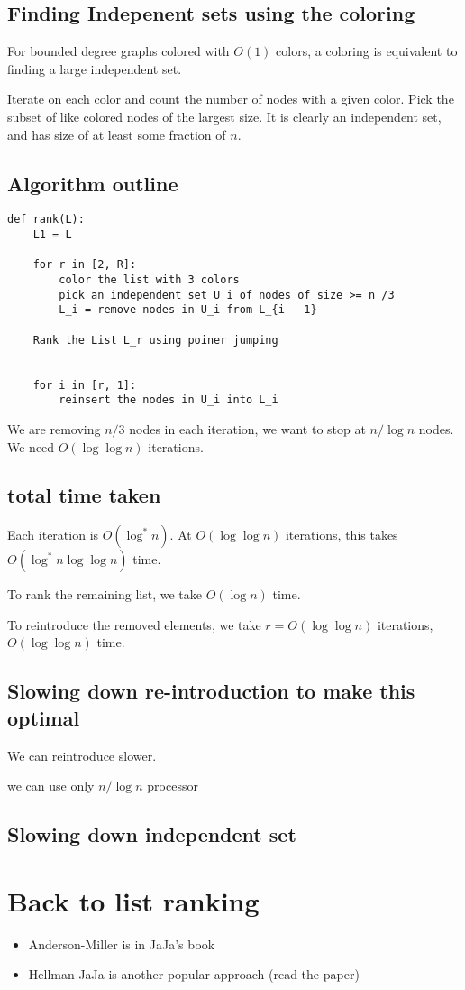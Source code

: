 \subsection{Finding Indepenent sets using the coloring}
For bounded degree graphs colored with $O(1)$ colors, a coloring is equivalent
to finding a large independent set.

Iterate on each color and count the number of nodes with a given color.
Pick the subset of like colored nodes of the largest size. It is clearly
an independent set, and has size of at least some fraction of $n$.

\subsection{Algorithm outline}

\begin{verbatim}
def rank(L):
    L1 = L

    for r in [2, R]:
        color the list with 3 colors
        pick an independent set U_i of nodes of size >= n /3
        L_i = remove nodes in U_i from L_{i - 1}

    Rank the List L_r using poiner jumping


    for i in [r, 1]:
        reinsert the nodes in U_i into L_i
\end{verbatim}

We are removing $n / 3$ nodes in each iteration, we want to stop at
$n / \log  n$ nodes. We need $O(\log \log n)$ iterations.


\subsection{total time taken}
Each iteration is $O(\log^* n)$. At $O(\log \log n)$ iterations, this takes
$O(\log^* n \log \log n)$ time.

To rank the remaining list, we take $O(\log n)$ time.

To reintroduce the removed elements, we take $r = O(\log \log n)$ iterations,
$O(\log \log n)$ time.


\subsection{Slowing down re-introduction to make this optimal}
We can reintroduce slower.

we can use only $n / \log n$ processor


\subsection{Slowing down independent set}


\section{Back to list ranking}
\begin{itemize}
    \item Anderson-Miller is in JaJa's book
    \item Hellman-JaJa is another popular approach (read the paper)
\end{itemize}

